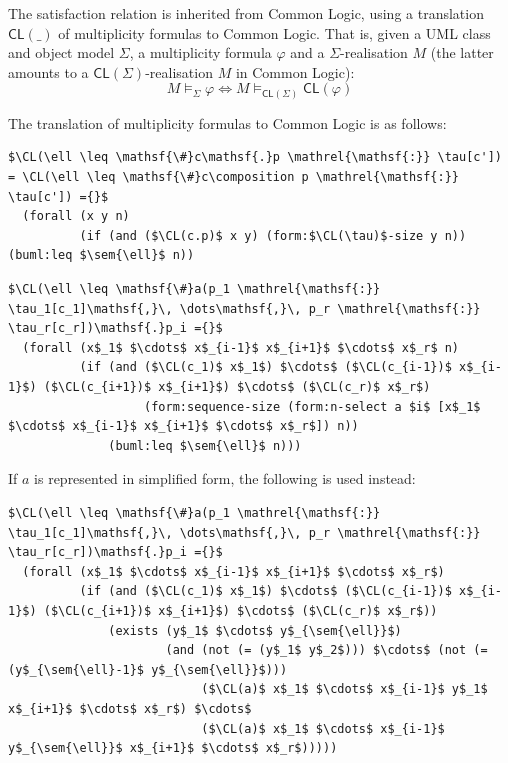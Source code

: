 \documentclass[10pt, a4paper]{isov2}
\newcommand*{\CL}{\ensuremath{\mathsf{CL}}\xspace}
\newcommand{\composition}{\raisebox{0.2pt}{\begin{sideways}\fontsize{6pt}{6pt}\selectfont$\blacklozenge$\end{sideways}}}
\newcommand{\sem}[1]{\mathopen\llbracket#1\mathclose\rrbracket}
\begin{document}

\label{a:UML-CD-sat}
The satisfaction relation is inherited from Common Logic, using
a translation $\CL(\_)$ of multiplicity formulas to Common Logic.
That is, given a UML class and object model $\Sigma$, a
multiplicity formula $\varphi$ and a $\Sigma$-realisation $M$ (the
latter amounts to a $\CL(\Sigma)$-realisation $M$ in Common Logic): 
%
\begin{equation*}
  M \models_\Sigma \varphi
\iff
  M \models_{\CL(\Sigma)} \CL(\varphi)
\end{equation*}

The translation of multiplicity formulas to Common Logic is as follows:

\begin{lstlisting}[language=clif, mathescape]
$\CL(\ell \leq \mathsf{\#}c\mathsf{.}p \mathrel{\mathsf{:}} \tau[c']) = \CL(\ell \leq \mathsf{\#}c\composition p \mathrel{\mathsf{:}} \tau[c']) ={}$
  (forall (x y n)
          (if (and ($\CL(c.p)$ x y) (form:$\CL(\tau)$-size y n)) (buml:leq $\sem{\ell}$ n))
\end{lstlisting}

\begin{lstlisting}[language=clif, mathescape]
$\CL(\ell \leq \mathsf{\#}a(p_1 \mathrel{\mathsf{:}} \tau_1[c_1]\mathsf{,}\, \dots\mathsf{,}\, p_r \mathrel{\mathsf{:}} \tau_r[c_r])\mathsf{.}p_i ={}$
  (forall (x$_1$ $\cdots$ x$_{i-1}$ x$_{i+1}$ $\cdots$ x$_r$ n)
          (if (and ($\CL(c_1)$ x$_1$) $\cdots$ ($\CL(c_{i-1})$ x$_{i-1}$) ($\CL(c_{i+1})$ x$_{i+1}$) $\cdots$ ($\CL(c_r)$ x$_r$)
                   (form:sequence-size (form:n-select a $i$ [x$_1$ $\cdots$ x$_{i-1}$ x$_{i+1}$ $\cdots$ x$_r$]) n))
              (buml:leq $\sem{\ell}$ n)))
\end{lstlisting}

\noindent If $a$ is represented in simplified form, the following is used instead:
\begin{lstlisting}[language=clif, mathescape]
$\CL(\ell \leq \mathsf{\#}a(p_1 \mathrel{\mathsf{:}} \tau_1[c_1]\mathsf{,}\, \dots\mathsf{,}\, p_r \mathrel{\mathsf{:}} \tau_r[c_r])\mathsf{.}p_i ={}$
  (forall (x$_1$ $\cdots$ x$_{i-1}$ x$_{i+1}$ $\cdots$ x$_r$)
          (if (and ($\CL(c_1)$ x$_1$) $\cdots$ ($\CL(c_{i-1})$ x$_{i-1}$) ($\CL(c_{i+1})$ x$_{i+1}$) $\cdots$ ($\CL(c_r)$ x$_r$))
              (exists (y$_1$ $\cdots$ y$_{\sem{\ell}}$)
                      (and (not (= (y$_1$ y$_2$))) $\cdots$ (not (= (y$_{\sem{\ell}-1}$ y$_{\sem{\ell}}$)))
                           ($\CL(a)$ x$_1$ $\cdots$ x$_{i-1}$ y$_1$ x$_{i+1}$ $\cdots$ x$_r$) $\cdots$
                           ($\CL(a)$ x$_1$ $\cdots$ x$_{i-1}$ y$_{\sem{\ell}}$ x$_{i+1}$ $\cdots$ x$_r$)))))
\end{lstlisting}
\end{document}
